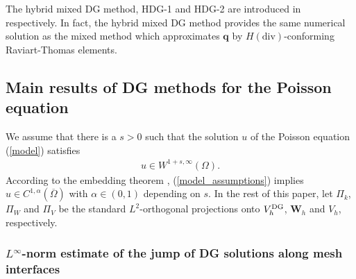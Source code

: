 \documentclass[1996/10/24]{amsart}
\theoremstyle{definition}
\numberwithin{equation}{section}
\begin{document}
The hybrid mixed DG method, HDG-1 and HDG-2 are introduced in \cite{es2010,cfq2018,qs2016} respectively.
In fact, the hybrid mixed DG method provides the same numerical solution as the mixed method which approximates
${\bm q}$ by $H(\text{div})$-conforming Raviart-Thomas elements.

\subsection{Main results of DG methods for the Poisson equation}\label{sec3:2}

We assume that there is a $s>0$ such that the solution $u$ of the Poisson equation (\ref{model}) satisfies
\begin{align}
\label{model_assumptions}
u \in W^{1+s,\infty}(\Omega).
\end{align}
According to the embedding theorem \cite[Theorem~$1.4.4.1$]{g1985}, (\ref{model_assumptions}) implies
$u \in C^{1,\alpha}(\overline{\Omega})$ with $\alpha\in (0,1)$ depending on $s$. In the rest of this paper, let $\Pi_{k}$, $\Pi_{W}$
and $\Pi_{V}$ be the standard $L^2$-orthogonal projections onto $V_h^{{\rm DG}}$, ${\bm W}_h$ and $V_h$, respectively.

\subsubsection{$L^{\infty}$-norm estimate of the jump of DG solutions along mesh interfaces}
\end{document}
